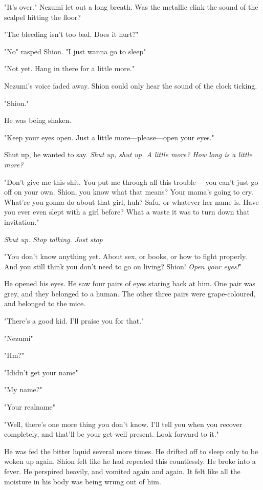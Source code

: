 "It's over." Nezumi let out a long breath. Was the metallic clink the
sound of the scalpel hitting the floor?

"The bleeding isn't too bad. Does it hurt?"

"No\el " rasped Shion. "I just wanna go to sleep\el "

"Not yet. Hang in there for a little more."

Nezumi's voice faded away. Shion could only hear the sound of the clock
ticking.

"Shion."

He was being shaken.

"Keep your eyes open. Just a little more---please---open your eyes."

Shut up, he wanted to say. \emph{Shut up, shut up. A little more? How long is
a little more?}

"Don't give me this shit. You put me through all this trouble--- you can't
just go off on your own. Shion, you know what that means? Your mama's
going to cry. What're you gonna do about that girl, huh? Safu, or
whatever her name is. Have you ever even slept with a girl before? What
a waste it was to turn down that invitation."

\emph{Shut up. Stop talking. Just stop\el }

"You don't know anything yet. About sex, or books, or how to fight
properly. And you still think you don't need to go on living? Shion!
\emph{Open your eyes!}"

He opened his eyes. He saw four pairs of eyes staring back at him. One
pair was grey, and they belonged to a human. The other three pairs were
grape-coloured, and belonged to the mice.

"There's a good kid. I'll praise you for that."

"Nezumi\el "

"Hm?"

"I\el didn't get your name\el "

"My name?"

"Your real\el name\el "

"Well, there's one more thing you don't know. I'll tell you when you
recover completely, and that'll be your get-well present. Look forward
to it."

He was fed the bitter liquid several more times. He drifted off to sleep
only to be woken up again. Shion felt like he had repeated this
countlessly. He broke into a fever. He perspired heavily, and vomited
again and again. It felt like all the moisture in his body was being
wrung out of him.

